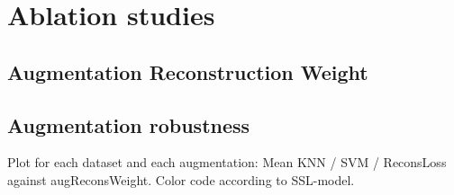 \documentclass[../../thesis.tex]{subfiles}
\begin{document}
\section{Ablation studies}

\subsection{Augmentation Reconstruction Weight}

\subsection{Augmentation robustness}

Plot for each dataset and each augmentation: 
Mean KNN / SVM / ReconsLoss against augReconsWeight. 
Color code according to SSL-model.
\end{document}

